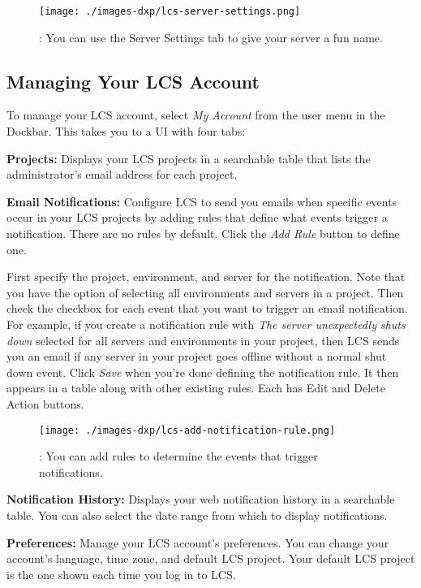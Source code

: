 \begin{figure}
\centering
\texttt{[image: ./images-dxp/lcs-server-settings.png]}
\caption{: You can use the Server Settings tab to give your server a fun
name.}
\end{figure}

\subsection{Managing Your LCS
Account}\label{managing-your-lcs-account}

To manage your LCS account, select \emph{My Account} from the user menu
in the Dockbar. This takes you to a UI with four tabs:

\textbf{Projects:} Displays your LCS projects in a searchable table that
lists the administrator's email address for each project.

\textbf{Email Notifications:} Configure LCS to send you emails when
specific events occur in your LCS projects by adding rules that define
what events trigger a notification. There are no rules by default. Click
the \emph{Add Rule} button to define one.

First specify the project, environment, and server for the notification.
Note that you have the option of selecting all environments and servers
in a project. Then check the checkbox for each event that you want to
trigger an email notification. For example, if you create a notification
rule with \emph{The server unexpectedly shuts down} selected for all
servers and environments in your project, then LCS sends you an email if
any server in your project goes offline without a normal shut down
event. Click \emph{Save} when you're done defining the notification
rule. It then appears in a table along with other existing rules. Each
has Edit and Delete Action buttons.

\begin{figure}
\centering
\texttt{[image: ./images-dxp/lcs-add-notification-rule.png]}
\caption{: You can add rules to determine the events that trigger
notifications.}
\end{figure}

\textbf{Notification History:} Displays your web notification history in
a searchable table. You can also select the date range from which to
display notifications.

\textbf{Preferences:} Manage your LCS account's preferences. You can
change your account's language, time zone, and default LCS project. Your
default LCS project is the one shown each time you log in to LCS.

